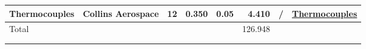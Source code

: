 \begin{table}[h]
{\begin{tabular}{|l|l|r|r|r|r|r|l|}
\hline
Thermocouples                                                  & {\cellcolor[rgb]{1,0.831,0.541}}Collins Aerospace        & 12                                                       & 0.350                                                                                             & 0.05                                 & 4.410                                                                                          & /                        & \href{https://prd-sc101-cdn.rtx.com/-/media/ca/product-assets/marketing/s/space/model-0118mf-high-reliability-surface-temperature-sensor-data-sheet.pdf?rev=64b96706e03f4d20a9c3f8dbc54e0fe4hash=FA6A53CD201F49CFC49B4DFBAA274200}{Thermocouples}  \\ 
\hline
\multicolumn{1}{|l}{{\cellcolor[rgb]{0.773,0.851,0.941}}Total} & \multicolumn{1}{l}{{\cellcolor[rgb]{0.773,0.851,0.941}}} & \multicolumn{1}{r}{{\cellcolor[rgb]{0.773,0.851,0.941}}} & \multicolumn{1}{r}{{\cellcolor[rgb]{0.773,0.851,0.941}}}                                          & {\cellcolor[rgb]{0.773,0.851,0.941}} & {\cellcolor[rgb]{0.773,0.851,0.941}}126.948                                                    & \multicolumn{1}{r}{}     & \multicolumn{1}{l}{}                                                                                                                                                                                                         \\ 
\cline{1-6}
\multicolumn{1}{l}{}                                           & \multicolumn{1}{l}{}                                     & \multicolumn{1}{r}{}                                     & \multicolumn{1}{r}{}                                                                              & \multicolumn{1}{r}{}                 & \multicolumn{1}{r}{}                                                                           & \multicolumn{1}{r}{}     & \multicolumn{1}{l}{}                                                                                                                                                                                                         \\
\multicolumn{1}{l}{}                                           & \multicolumn{1}{l}{}                                     & \multicolumn{1}{r}{}                                     & \multicolumn{1}{r}{}                                                                              & \multicolumn{1}{r}{}                 & \multicolumn{1}{r}{}                                                                           & \multicolumn{1}{r}{}     & \multicolumn{1}{l}{}                                                                                                                                                                                                         \\

\end{tabular}}
\end{table}
